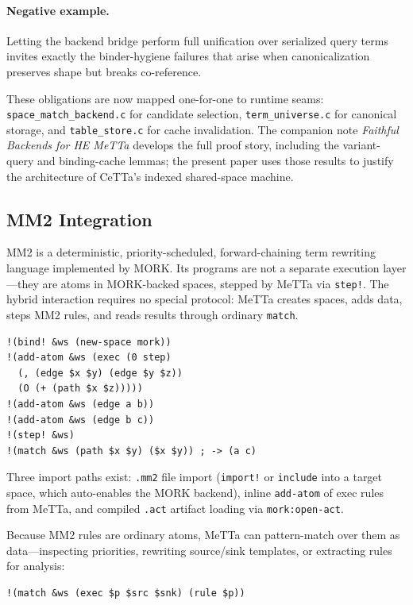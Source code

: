\documentclass[11pt]{article}
\newcommand{\code}[1]{\texttt{#1}}
\newcommand{\CeTTa}{\textup{CeTTa}}
\begin{document}
\paragraph{Negative example.}
Letting the backend bridge perform full unification over serialized query
terms invites exactly the binder-hygiene failures that arise when
canonicalization preserves shape but breaks co-reference.

These obligations are now mapped one-for-one to runtime seams:
\code{space\_match\_backend.c} for candidate selection, \code{term\_universe.c}
for canonical storage, and \code{table\_store.c} for cache invalidation.  The
companion note \emph{Faithful Backends for HE MeTTa} develops the full proof
story, including the variant-query and binding-cache lemmas; the present
paper uses those results to justify the architecture of \CeTTa{}'s indexed
shared-space machine.

\subsection{MM2 Integration}

MM2 is a deterministic, priority-scheduled, forward-chaining term rewriting
language implemented by MORK\@.  Its programs are not a separate execution
layer---they are atoms in MORK-backed spaces, stepped by MeTTa via
\code{step!}.  The hybrid interaction requires no special protocol: MeTTa
creates spaces, adds data, steps MM2 rules, and reads results through ordinary
\code{match}.

\begin{verbatim}
!(bind! &ws (new-space mork))
!(add-atom &ws (exec (0 step)
  (, (edge $x $y) (edge $y $z))
  (O (+ (path $x $z)))))
!(add-atom &ws (edge a b))
!(add-atom &ws (edge b c))
!(step! &ws)
!(match &ws (path $x $y) ($x $y)) ; -> (a c)
\end{verbatim}

Three import paths exist: \code{.mm2} file import (\code{import!} or
\code{include} into a target space, which auto-enables the MORK backend),
inline \code{add-atom} of exec rules from MeTTa, and compiled \code{.act}
artifact loading via \code{mork:open-act}.

Because MM2 rules are ordinary atoms, MeTTa can pattern-match over them as
data---inspecting priorities, rewriting source/sink templates, or extracting
rules for analysis:
\begin{verbatim}
!(match &ws (exec $p $src $snk) (rule $p))
\end{verbatim}
\end{document}
